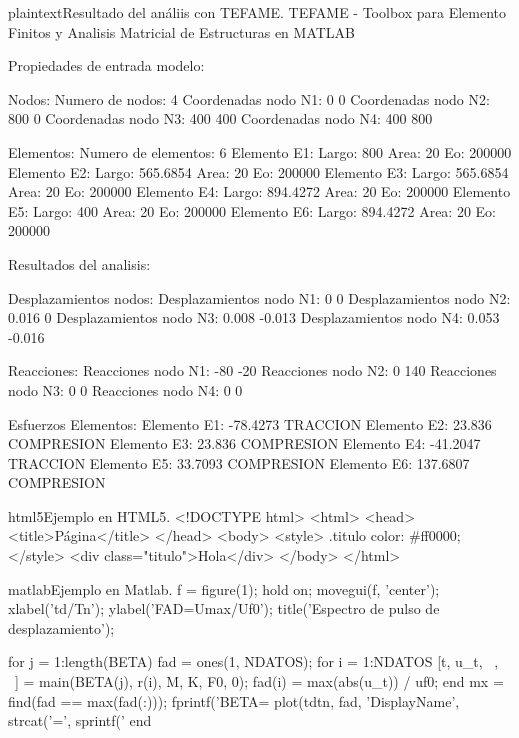 \begin{sourcecode}{plaintext}{Resultado del análiis con TEFAME.}
TEFAME - Toolbox para Elemento Finitos y Analisis
Matricial de Estructuras en MATLAB

Propiedades de entrada modelo:

Nodos: 
Numero de nodos: 4 
Coordenadas nodo N1: 0 0
Coordenadas nodo N2: 800 0
Coordenadas nodo N3: 400 400
Coordenadas nodo N4: 400 800

Elementos: 
Numero de elementos: 6 
Elemento E1:	Largo: 800         Area: 20        Eo: 200000    
Elemento E2:	Largo: 565.6854    Area: 20        Eo: 200000    
Elemento E3:	Largo: 565.6854    Area: 20        Eo: 200000    
Elemento E4:	Largo: 894.4272    Area: 20        Eo: 200000    
Elemento E5:	Largo: 400         Area: 20        Eo: 200000    
Elemento E6:	Largo: 894.4272    Area: 20        Eo: 200000    

Resultados del analisis:

Desplazamientos nodos: 
Desplazamientos nodo N1: 0 0
Desplazamientos nodo N2: 0.016 0
Desplazamientos nodo N3: 0.008 -0.013
Desplazamientos nodo N4: 0.053 -0.016

Reacciones: 
Reacciones nodo N1: -80 -20
Reacciones nodo N2: 0 140
Reacciones nodo N3: 0 0
Reacciones nodo N4: 0 0

Esfuerzos Elementos: 
Elemento E1: -78.4273       TRACCION
Elemento E2: 23.836         COMPRESION
Elemento E3: 23.836         COMPRESION
Elemento E4: -41.2047       TRACCION
Elemento E5: 33.7093        COMPRESION
Elemento E6: 137.6807       COMPRESION
\end{sourcecode}

\begin{sourcecode}[\label{codigo-html5}]{html5}{Ejemplo en HTML5.}
<!DOCTYPE html>
<html>
<head>
	<title>Página</title>
</head>
<body>
	<style>
		.titulo {
			color: #ff0000;
		}
	</style>
	<div class="titulo">Hola</div>
</body>
</html>
\end{sourcecode}

\begin{sourcecode}[\label{codigo-matlab}]{matlab}{Ejemplo en Matlab.}
f = figure(1);
hold on;
movegui(f, 'center');
xlabel('td/Tn'); ylabel('FAD=Umax/Uf0');
title('Espectro de pulso de desplazamiento');

for j = 1:length(BETA)
	fad = ones(1, NDATOS); %
	for i = 1:NDATOS
		[t, u_t, ~, ~] = main(BETA(j), r(i), M, K, F0, 0);
		fad(i) = max(abs(u_t)) / uf0;
	end
mx = find(fad == max(fad(:)));
fprintf('BETA=%
plot(tdtn, fad, 'DisplayName', strcat('\beta=', sprintf('%
end	
\end{sourcecode}

